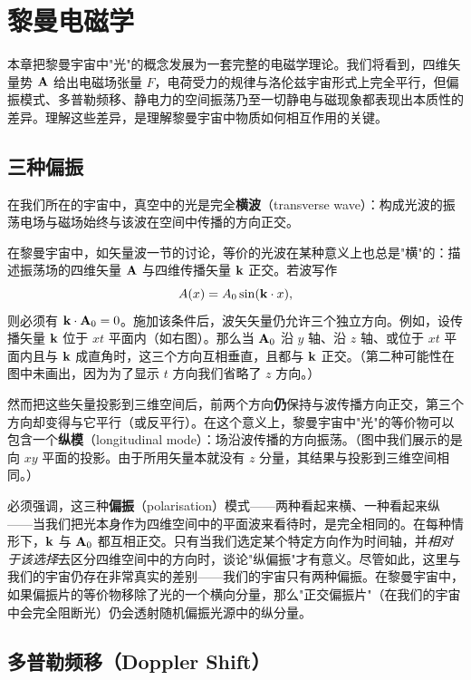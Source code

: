 \chapter{黎曼电磁学}

本章把黎曼宇宙中"光"的概念发展为一套完整的电磁学理论。我们将看到，四维矢量势 $\mathbf{A}$ 给出电磁场张量 $F$，电荷受力的规律与洛伦兹宇宙形式上完全平行，但偏振模式、多普勒频移、静电力的空间振荡乃至一切静电与磁现象都表现出本质性的差异。理解这些差异，是理解黎曼宇宙中物质如何相互作用的关键。

\section{三种偏振}

在我们所在的宇宙中，真空中的光是完全\textbf{横波}（transverse wave）：构成光波的振荡电场与磁场始终与该波在空间中传播的方向正交。


在黎曼宇宙中，如矢量波一节的讨论，等价的光波在某种意义上也总是"横"的：描述振荡场的四维矢量 $\mathbf{A}$ 与四维传播矢量 $\mathbf{k}$ 正交。若波写作
\[
A(x) = A_0 \sin(\mathbf{k} \cdot x),
\]
则必须有 $\mathbf{k} \cdot \mathbf{A}_0 = 0$。施加该条件后，波矢矢量仍允许三个独立方向。例如，设传播矢量 $\mathbf{k}$ 位于 $xt$ 平面内（如右图）。那么当 $\mathbf{A}_0$ 沿 $y$ 轴、沿 $z$ 轴、或位于 $xt$ 平面内且与 $\mathbf{k}$ 成直角时，这三个方向互相垂直，且都与 $\mathbf{k}$ 正交。（第二种可能性在图中未画出，因为为了显示 $t$ 方向我们省略了 $z$ 方向。）

然而把这些矢量投影到三维空间后，前两个方向\textbf{仍}保持与波传播方向正交，第三个方向却变得与它平行（或反平行）。在这个意义上，黎曼宇宙中"光"的等价物可以包含一个\textbf{纵模}（longitudinal mode）：场沿波传播的方向振荡。（图中我们展示的是向 $xy$ 平面的投影。由于所用矢量本就没有 $z$ 分量，其结果与投影到三维空间相同。）

必须强调，这三种\textbf{偏振}（polarisation）模式——两种看起来横、一种看起来纵——当我们把光本身作为四维空间中的平面波来看待时，是完全相同的。在每种情形下，$\mathbf{k}$ 与 $\mathbf{A}_0$ 都互相正交。只有当我们选定某个特定方向作为时间轴，并\emph{相对于该选择}去区分四维空间中的方向时，谈论"纵偏振"才有意义。尽管如此，这里与我们的宇宙仍存在非常真实的差别——我们的宇宙只有两种偏振。在黎曼宇宙中，如果偏振片的等价物移除了光的一个横向分量，那么"正交偏振片"（在我们的宇宙中会完全阻断光）仍会透射随机偏振光源中的纵分量。

\section{多普勒频移（Doppler Shift）}

